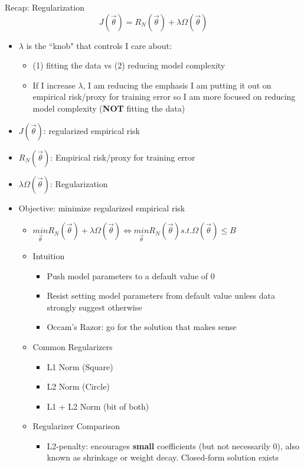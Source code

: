 \documentclass[10pt, oneside]{article}
\begin{document}
Recap: Regularization
$$J(\vec \theta) = R_N (\vec \theta) + \lambda \Omega (\vec \theta) $$
\begin{itemize}
    \item $\lambda$ is the ``knob" that controls I care about:
    \begin{itemize}
        \item (1) fitting the data vs (2) reducing model complexity
        \item If I increase $\lambda$, I am reducing the emphasis I am putting it out on empirical risk/proxy for training error so I am more focused on reducing model complexity (\textbf{NOT} fitting the data)
    \end{itemize}
    \item $J(\vec \theta)$: regularized empirical risk
    \item $R_N(\vec \theta)$: Empirical risk/proxy for training error
    \item $\lambda \Omega (\vec \theta)$: Regularization
    \item Objective: minimize regularized empirical risk
    \begin{itemize}
        \item $\underset{\vec \theta}{min} R_N(\vec \theta) + \lambda \Omega(\vec \theta) \Leftrightarrow \underset{\vec \theta}{min} R_N (\vec \theta) s.t. \Omega (\vec \theta) \leq B$
        \item Intuition
        \begin{itemize}
            \item Push model parameters to a default value of 0
            \item Resist setting model parameters from default value unless data strongly suggest otherwise
            \item Occam's Razor: go for the solution that makes sense
        \end{itemize}
        \item Common Regularizers
        \begin{itemize}
            \item L1 Norm (Square)
            \item L2 Norm (Circle)
            \item L1 + L2 Norm (bit of both)
        \end{itemize}
        \item Regularizer Comparison
        \begin{itemize}
            \item L2-penalty: encourages \textbf{small} coefficients (but not necessarily 0), also known as shrinkage or weight decay. Closed-form solution exists

\end{itemize}
\end{itemize}
\end{itemize}
\end{document}
